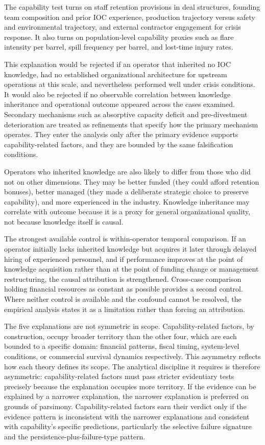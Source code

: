 The capability test turns on staff retention provisions in deal
structures, founding team composition and prior IOC experience,
production trajectory versus safety and environmental trajectory, and
external contractor engagement for crisis response. It also turns on
population-level capability proxies such as flare intensity per barrel,
spill frequency per barrel, and lost-time injury rates.

This explanation would be rejected if an operator that inherited no IOC
knowledge, had no established organizational architecture for upstream
operations at this scale, and nevertheless performed well under crisis
conditions. It would also be rejected if no observable correlation
between knowledge inheritance and operational outcome appeared across
the cases examined. Secondary mechanisms such as absorptive capacity
deficit and pre-divestment deterioration are treated as refinements that
specify how the primary mechanism operates. They enter the analysis only
after the primary evidence supports capability-related factors, and they
are bounded by the same falsification conditions.

Operators who inherited knowledge are also likely to differ from those
who did not on other dimensions. They may be better funded (they could
afford retention bonuses), better managed (they made a deliberate
strategic choice to preserve capability), and more experienced in the
industry. Knowledge inheritance may correlate with outcome because it is
a proxy for general organizational quality, not because knowledge itself
is causal.

The strongest available control is within-operator temporal comparison.
If an operator initially lacks inherited knowledge but acquires it later
through delayed hiring of experienced personnel, and if performance
improves at the point of knowledge acquisition rather than at the point
of funding change or management restructuring, the causal attribution is
strengthened. Cross-case comparison holding financial resources as
constant as possible provides a second control. Where neither control is
available and the confound cannot be resolved, the empirical analysis
states it as a limitation rather than forcing an attribution.

The five explanations are not symmetric in scope. Capability-related
factors, by construction, occupy broader territory than the other four,
which are each bounded to a specific domain: financial patterns, fiscal
timing, system-level conditions, or commercial survival dynamics
respectively. This asymmetry reflects how each theory defines its scope.
The analytical discipline it requires is therefore asymmetric:
capability-related factors must pass stricter evidentiary tests
precisely because the explanation occupies more territory. If the
evidence can be explained by a narrower explanation, the narrower
explanation is preferred on grounds of parsimony. Capability-related
factors earn their verdict only if the evidence pattern is inconsistent
with the narrower explanations and consistent with capability's specific
predictions, particularly the selective failure signature and the
persistence-plus-failure-type pattern.

